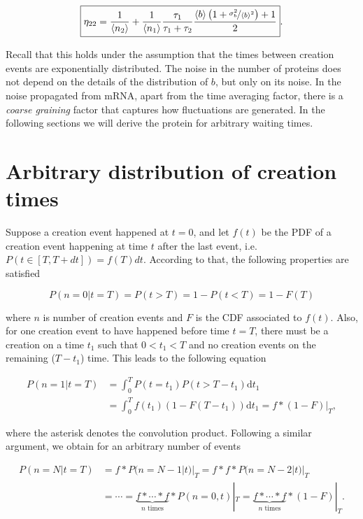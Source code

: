 \begin{equation}
  \boxed{\eta_{22}=\frac{1}{\langle n_2\rangle} + \frac{1}{\langle n_1\rangle} \frac{\tau_1}{\tau_1 + \tau_2} \frac{\langle b\rangle\left(1+\nicefrac{\sigma_b^2}{\langle b\rangle^2}\right)+1}{2}}.
\end{equation}

Recall that this holds under the assumption that the times between creation events are exponentially distributed. The noise in the number of proteins does not depend on the details of the distribution of $b$, but only on its noise. In the noise propagated from mRNA, apart from the time averaging factor, there is a \textit{coarse graining} factor that captures how fluctuations are generated. In the following sections we will derive the protein for arbitrary waiting times.

\section{Arbitrary distribution of creation times}

Suppose a creation event happened at $t=0$, and let $f(t)$ be the PDF of a creation event happening at time $t$ after the last event, i.e. $P(t\in[T,T+dt])=f(T)dt$. According to that, the following properties are satisfied

\begin{equation*}
P(n=0|t=T) = P(t>T) = 1 - P(t<T) = 1 - F(T)
\end{equation*}

where $n$ is number of creation events and $F$ is the CDF associated to $f(t)$. Also, for one creation event to have happened before time $t=T$, there must be a creation on a time $t_1$ such that $0<t_1<T$ and no creation events on the remaining ($T-t_1$) time. This leads to the following equation

\begin{equation*}
  \begin{split}
    P(n=1|t=T) &= \int_0^TP(t=t_1)P(t>T-t_1)\mathrm{d}t_1 \\
    &= \int_0^Tf(t_1)(1-F(T-t_1))\mathrm{d}t_1=f\ast (1-F)|_T,
  \end{split}
\end{equation*}

where the asterisk denotes the convolution product. Following a similar argument, we obtain for an arbitrary number of events

\begin{equation}
  \label{eq:nconvs}
  \begin{split}
    P(n=N|t=T) &= f\ast P(n=N-1|t)|_T = f\ast f\ast P(n=N-2|t)|_T \\
    &= \cdots = \underbrace{f\ast\cdots\ast f}_{n \text{ times}}\ast P(n=0,t)|_T = \underbrace{f\ast\cdots\ast f}_{n \text{ times}}\ast (1-F)|_T.
  \end{split}
\end{equation}

